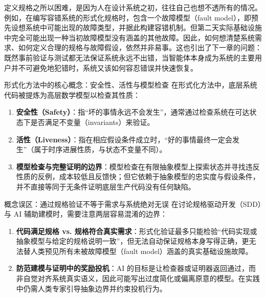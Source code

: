 \documentclass[UTF8,a4paper,11pt,fontset=fandol]{ctexart}
\begin{document}
定义规格之所以困难，是因为人在设计系统之初，往往自己也想不透所有的情况。例如，在编写容错系统的形式化规格时，包含一个故障模型（fault model），即预先设想系统中可能出现的故障类型，并据此构建容错机制。但第二天实际基础设施中完全可能出现一种当初故障模型没有涵盖的其他故障。因此，如何想清楚系统需求、如何定义合理的规格与故障假设，依然并非易事。这也引出了下一章的问题：既然事前验证与测试都无法保证系统永远不出错，当智能体本身成为系统的主要用户并不可避免地犯错时，系统又该如何容忍错误并快速恢复。

\begin{importantbox}{形式化方法中的核心概念：安全性、活性与模型检查}
在形式化方法中，底层系统代码被提炼为高层数学模型以检查其性质：
\begin{enumerate}
\item \textbf{安全性（Safety）}：指“坏的事情永远不会发生”，通常通过检查系统在可达状态下是否满足不变量（invariants）来验证。
\item \textbf{活性（Liveness）}：指在相应假设条件成立时，“好的事情最终一定会发生”（属于时序进展性质，与状态不变量不同）。
\item \textbf{模型检查与完整证明的边界}：模型检查在有限抽象模型上探索状态并寻找违反性质的反例，成本较低且反馈快；但它依赖于抽象模型的忠实度与假设条件，并不直接等同于无条件证明底层生产代码没有任何缺陷。
\end{enumerate}
\end{importantbox}
\begin{warningbox}{概念误区：通过规格验证不等于需求与系统绝对无误}
在讨论规格驱动开发（SDD）与 AI 辅助建模时，需要注意两层容易混淆的边界：
\begin{enumerate}
\item \textbf{代码满足规格 vs. 规格符合真实需求}：形式化验证最多只能检验“代码实现或抽象模型与给定的规格说明一致”，但无法自动保证规格本身写得正确，更无法替人类预见所有未被故障模型（fault model）涵盖的真实基础设施故障。
\item \textbf{防范建模与证明中的奖励投机}：AI 的目标是让检查器或证明器返回通过，而非自觉对齐系统真实语义，因此可能写出过度简化或偏离原意的模型。在实践中仍需人类专家引导抽象边界并约束投机行为。
\end{enumerate}
\end{warningbox}
\end{document}
